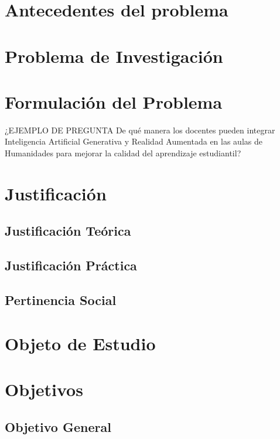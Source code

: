 \documentclass[11pt,oneside,letterpaper]{book}
\begin{document}
\section{Antecedentes del problema}
\lipsum[1]

\section{Problema de Investigación}
\lipsum[1]

\section{Formulación del Problema}
¿EJEMPLO DE PREGUNTA De qué manera los docentes pueden integrar Inteligencia Artificial Generativa y Realidad Aumentada en las aulas de Humanidades para mejorar la calidad del aprendizaje estudiantil?

\section{Justificación}
\lipsum[1]

\subsection{Justificación Teórica}
\lipsum[1]

\subsection{Justificación Práctica}
\lipsum[1]

\subsection{Pertinencia Social}
\lipsum[1]

\section{Objeto de Estudio}
\lipsum[1]

\section{Objetivos}
\lipsum[1]

\subsection{Objetivo General}
\lipsum[1]
\end{document}
